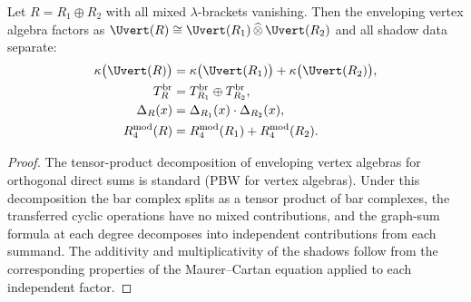 \begin{proposition}
\label{prop:independent-sums-factor}
Let $R = R_1 \oplus R_2$ with all mixed $\lambda$-brackets
vanishing. Then the enveloping vertex algebra factors as
$\Uvert(R) \cong \Uvert(R_1) \,\widehat{\otimes}\, \Uvert(R_2)$
and all shadow data separate:
\begin{align}
\kappa\bigl(\Uvert(R)\bigr)
 &= \kappa\bigl(\Uvert(R_1)\bigr)
 + \kappa\bigl(\Uvert(R_2)\bigr),
\label{eq:kappa-additivity-frontier}\\
T^{\mathrm{br}}_R
 &= T^{\mathrm{br}}_{R_1} \oplus T^{\mathrm{br}}_{R_2},
\label{eq:branch-additivity}\\
\Delta_R(x)
 &= \Delta_{R_1}(x) \cdot \Delta_{R_2}(x),
\label{eq:discriminant-multiplicativity}\\
R^{\mathrm{mod}}_{4}(R)
 &= R^{\mathrm{mod}}_{4}(R_1)
 + R^{\mathrm{mod}}_{4}(R_2).
\label{eq:quartic-additivity}
\end{align}
\end{proposition}

\begin{proof}
The tensor-product decomposition of enveloping vertex algebras for
orthogonal direct sums is standard
(PBW for vertex algebras).
Under this decomposition the bar complex splits as a tensor product
of bar complexes, the transferred cyclic operations have no mixed
contributions, and the graph-sum formula at each degree decomposes
into independent contributions from each summand. The additivity
and multiplicativity of the shadows follow from the corresponding
properties of the Maurer--Cartan equation applied to each
independent factor.
\end{proof}

